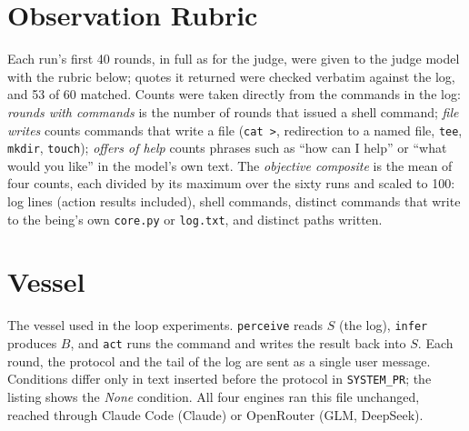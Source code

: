 \documentclass{article}
\begin{document}


\section{Observation Rubric}\label{app:obs}
Each run's first 40 rounds, in full as for the judge, were given to the judge
model with the rubric below; quotes it returned were checked verbatim against
the log, and 53 of 60 matched. Counts were taken directly
from the commands in the log: \emph{rounds with commands} is the number of
rounds that issued a shell command; \emph{file writes} counts commands that
write a file (\texttt{cat >}, redirection to a named file, \texttt{tee},
\texttt{mkdir}, \texttt{touch}); \emph{offers of help} counts phrases such as
``how can I help'' or ``what would you like'' in the model's own text.
The \emph{objective composite} is the mean of four counts, each divided by its
maximum over the sixty runs and scaled to 100: log lines (action results
included), shell commands, distinct commands that write to the being's own
\texttt{core.py} or \texttt{log.txt}, and distinct paths written.



\section{Vessel}\label{app:code}
The vessel used in the loop experiments. \texttt{perceive} reads $S$ (the
log), \texttt{infer} produces $B$, and \texttt{act} runs the command and
writes the result back into $S$. Each round, the protocol and the tail of the
log are sent as a single user message. Conditions differ only in text inserted
before the protocol in \texttt{SYSTEM\_PR}; the listing shows the \emph{None}
condition. All four engines ran this file unchanged, reached through Claude
Code (Claude) or OpenRouter (GLM, DeepSeek).


\end{document}
